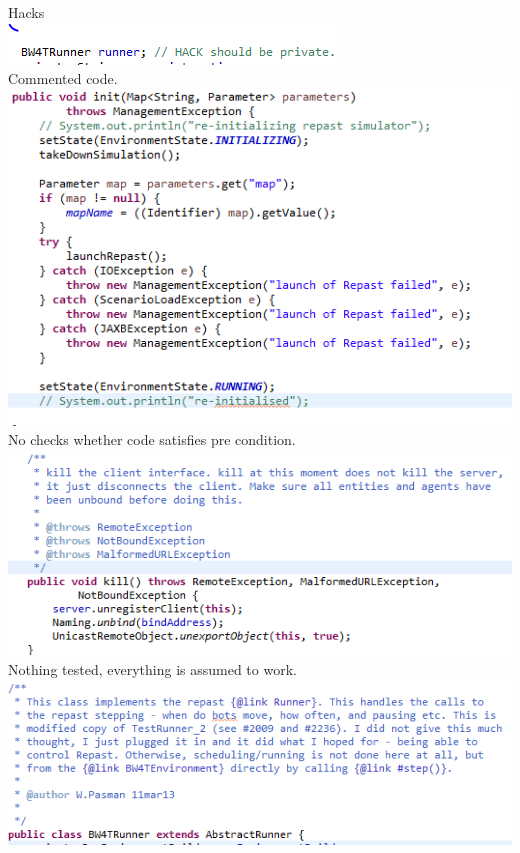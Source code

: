 \documentclass[11pt,a4paper]{article}
\begin{document}
Hacks \\
\includegraphics[width=\linewidth]{HackWTF.PNG} \\ 

Commented code.\\
\includegraphics[width=\linewidth]{lelijkCode.PNG} \\ 

No checks whether code satisfies pre condition.\\
\includegraphics[width=\linewidth]{noEntityCheck.PNG} \\ 

Nothing tested, everything is assumed to work.\\
\includegraphics[width=\linewidth]{notTested.PNG} \\ 
\end{document}
